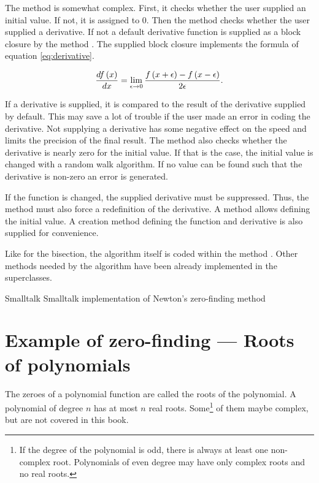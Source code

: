 The method  is somewhat complex. First,
it checks whether the user supplied an initial value. If not, it
is assigned to 0. Then the method checks whether the user supplied
a derivative. If not a default derivative function is supplied as
a block closure by the method . The
supplied block closure implements the formula of equation
\ref{eq:derivative}.

\begin{equation}
\label{eq:derivative} {df\left(x\right)\over dx}=\lim_{\epsilon\to
0}{f\left(x+\epsilon\right)-f\left(x-\epsilon\right)\over
2\epsilon}.
\end{equation}

If a derivative is supplied, it is compared to the result of the
derivative supplied by default. This may save a lot of trouble if
the user made an error in coding the derivative. Not supplying a
derivative has some negative effect on the speed and limits the
precision of the final result. The method  also checks whether the derivative is nearly
zero for the initial value. If that is the case, the initial value
is changed with a random walk algorithm. If no value can be found
such that the derivative is non-zero an error is generated.

If the function is changed, the supplied derivative must be
suppressed.
Thus, the method  must also force a
redefinition of the derivative.
A method allows defining the initial value. A creation method defining the function and
derivative is also supplied for convenience.

Like for the bisection, the algorithm itself is coded within the
method . Other methods needed by the
algorithm have been already implemented in the superclasses.

\begin{listing}[label=lst:newtonZero]{Smalltalk}
{Smalltalk implementation of Newton's zero-finding method}

\end{listing}

%

\section{Example of zero-finding --- Roots of polynomials}
\label{sec:polroots} The zeroes of a polynomial function are
called the roots of the polynomial. A polynomial of degree $n$ has
at most $n$ real roots. Some\footnote{If the degree of the
polynomial is odd, there is always at least one non-complex root.
Polynomials of even degree may have only complex roots and no real
roots.} of them maybe complex, but are not covered in this book.

